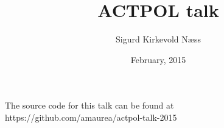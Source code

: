 \documentclass[table]{beamer}
\title{ACTPOL talk}
\author{Sigurd Kirkevold Næss}
\institute{Subdepartment of astrophysics, Oxford University}
\date{February, 2015}
\begin{document}
\begin{frame}
	\titlepage
	\vspace{-1cm}
	\begin{center}
	{\footnotesize The source code for this talk can be found at {\color[rgb]{0,0.7,0}https://github.com/amaurea/actpol-talk-2015}}
	\end{center}
\end{frame}

%
%


\end{document}
